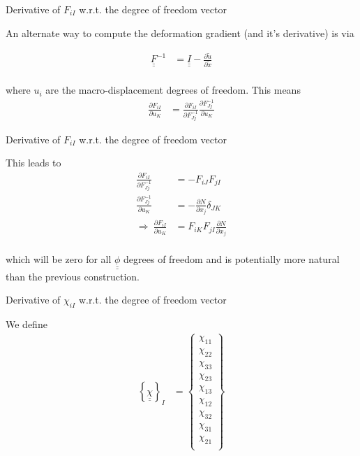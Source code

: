 \documentclass[11pt]{beamer}
\newcommand{\TEN}[1]{\underline{\underline{#1}}}
\newcommand{\VEC}[1]{\utilde{#1}}
\begin{document}
\begin{frame}{Derivative of $F_{iI}$ w.r.t. the degree of freedom vector}

An alternate way to compute the deformation gradient (and it's derivative) is via

\begin{align*}
\TEN{F}^{-1} &= \TEN{I} - \frac{\partial \VEC{u}}{\partial \VEC{x}}\\
\end{align*}

where $u_i$ are the macro-displacement degrees of freedom. This means
\begin{align*}
\frac{\partial F_{iI}}{\partial u_K} &=  \frac{\partial F_{iI}}{\partial F_{Jj}^{-1}}\frac{\partial F_{Jj}^{-1}}{\partial u_K}
\end{align*}

\end{frame}

\begin{frame}{Derivative of $F_{iI}$ w.r.t. the degree of freedom vector}

This leads to
\begin{align*}
\frac{\partial F_{iI}}{\partial F_{Jj}^{-1}} &= -F_{iJ} F_{jI}\\
\frac{\partial F_{Jj}^{-1}}{\partial u_K} &= -\frac{\partial N}{\partial x_j} \delta_{JK}\\
\Rightarrow\ \frac{\partial F_{iI}}{\partial u_K} &= F_{iK} F_{jI}\frac{\partial N}{\partial x_j}\\
\end{align*}

which will be zero for all $\TEN{\phi}$ degrees of freedom and is potentially more natural than the previous construction.

\end{frame}

\begin{frame}{Derivative of $\chi_{iI}$ w.r.t. the degree of freedom vector}

We define
\begin{align*}
\left\{\TEN{\chi}\right\}_I &= \left\{\begin{array}{c}
\chi_{11}\\
\chi_{22}\\
\chi_{33}\\
\chi_{23}\\
\chi_{13}\\
\chi_{12}\\
\chi_{32}\\
\chi_{31}\\
\chi_{21}\\
\end{array}\right\}
\end{align*}

\end{frame}
\end{document}
